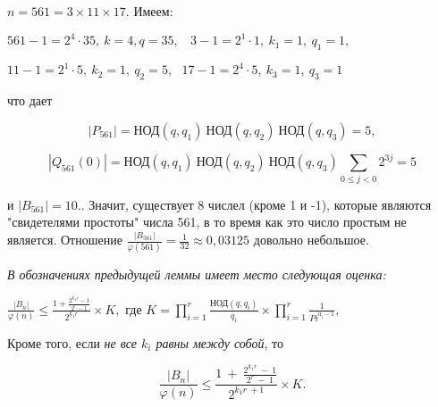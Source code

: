\documentclass{mai_book}
\begin{document}
	$n = 561 = 3 \times 11 \times 17$. Имеем:
	
	\begin{center}
		
		$561 - 1 = 2^4 \cdot 35,~k = 4, q = 35,~~~~ 3 - 1 = 2^1 \cdot 1,~k_1 = 1,~q_1 = 1,$
		
		$11 - 1 = 2^1 \cdot 5,~k_2 = 1,~q_2 = 5,~~~ 17 - 1 = 2^4 \cdot 5,~k_3 = 1,~q_3 = 1$
		
	\end{center}
	
	что дает
	
	$$|P_{561}| = \text{НОД}(q, q_1)~\text{НОД}(q, q_2)~\text{НОД}(q, q_3) = 5,$$
	
	$$|Q_{561}(0)| = \text{НОД}(q, q_1)~\text{НОД}(q, q_2)~\text{НОД}(q, q_3) \sum_{0 \leqslant j < 0} 2^{3j} = 5$$
	
	\noindent и $|B_{561}| = 10.$. Значит, существует 8 числел (кроме 1 и -1), которые являются "свидетелями простоты" числа 561, в то время как это число простым не является. Отношение $\frac{|B_{561}|}{\varphi(561)} = \frac{1}{32} \approx 0, 03125$ довольно небольшое.
	
	\begin{lemma}
		
		\hspace*{0,5cm}
		
		\textit{В обозначениях предыдущей леммы имеет место следующая оценка:}
		
		\begin{center}
			
			$\frac{|B_n|}{\varphi(n)} \leqslant \frac{1 + \frac{2^{k_1r} -1}{2^{r} - 1}}{2^{k_1r}} \times K,$ где $ K = \prod_{i=1}^{r} \frac{\text{НОД}(q, q_i)}{q_i} \times \prod_{i=1}^{r} \frac{1}{Pi^{a_i-1}},$
			
		\end{center}
		
		Кроме того, если \textit{не все $k_i$ равны между собой}, то
		
		$$\frac{|B_n|}{\varphi(n)} \leqslant \frac{1~+~\frac{2^{k_1r}~-~1}{2^{r}~-~1}}{2^{k_1r~+1}} \times K.$$
		
	\end{lemma}
	
\end{document}
